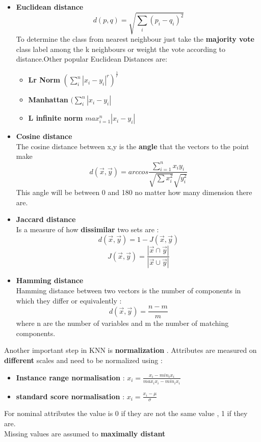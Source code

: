 \begin{itemize}
\item \textbf{Euclidean distance}\\
$$ d(p,q) = \sqrt{\sum \limits_i (p_i-q_i)^2}$$
To determine the class from nearest neighbour just take the \textbf{majority vote} class label among the k neighbours or weight the vote according to distance.Other popular Euclidean Distances are:
\begin{itemize}
\item \textbf{Lr Norm} $ (\sum \limits_{i}^{n} |x_i - y_i|^r)^{\frac{1}{r}}$ 
\item \textbf{Manhattan} $(\sum \limits_{i}^{n} |x_i - y_i|$
\item \textbf{L infinite norm} $max_{i=1}^n |x_i-y_i|$
\end{itemize}

\item \textbf{Cosine distance}\\
The cosine distance between x,y is the \textbf{angle} that the vectors to the point make $$ d(\overrightarrow{x},\overrightarrow{y})= arccos \frac{\sum \limits_{i=1}^{n}x_iy_i}{\sqrt{\sum \limits x_i^2}\sqrt{y_i^2}}$$
This angle will be between 0 and 180 no matter how many dimension there are.

\item \textbf{Jaccard distance}\\
Is a measure of how \textbf{dissimilar} two sets are : 
$$ d(\overrightarrow{x},\overrightarrow{y}) = 1-J(\overrightarrow{x},\overrightarrow{y}) $$
$$ J(\overrightarrow{x},\overrightarrow{y}) = \frac{|\overrightarrow{x} \cap \overrightarrow{y}|}{|\overrightarrow{x} \cup \overrightarrow{y}|}$$

\item \textbf{Hamming distance}\\
Hamming distance between two vectors is the number of components in which they differ or equivalently : 
$$ d(\overrightarrow{x},\overrightarrow{y}) = \frac{n-m}{m}$$ where n are the number of variables and m the number of matching components.
 
\end{itemize}
Another important step in KNN is \textbf{normalization} . Attributes are measured on \textbf{different} scales and need to be normalized using :
\begin{itemize}
\item \textbf{Instance range normalisation} : $x_i = \frac{x_i - min_i x_i}{max_i x_i - min_i x_i}$
\item \textbf{standard score normalisation} : $x_i = \frac{x_i - \mu }{\sigma}$ 
\end{itemize}
For nominal attributes the value is 0 if they are not the same value , 1 if they are.\\
Missing values are assumed to \textbf{maximally distant}

